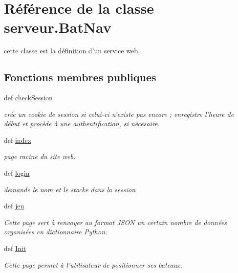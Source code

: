 \hypertarget{classserveur_1_1BatNav}{\section{Référence de la classe serveur.\-Bat\-Nav}
\label{classserveur_1_1BatNav}
}


cette classe est la définition d'un service web.  


\subsection*{Fonctions membres publiques}
\begin{DoxyCompactItemize}
\item 
def \hyperlink{classserveur_1_1BatNav_a4bee30dcf9c6439b0120b0f84e351c8e}{check\-Session}
\begin{DoxyCompactList}\small\item\em crée un cookie de session si celui-\/ci n'existe pas encore ; enregistre l'heure de début et procède à une authentification, si nécesaire. \end{DoxyCompactList}\item 
def \hyperlink{classserveur_1_1BatNav_a788dcf39ae9210eece7d5a1ee4ea593e}{index}
\begin{DoxyCompactList}\small\item\em page racine du site web. \end{DoxyCompactList}\item 
def \hyperlink{classserveur_1_1BatNav_afb6d70a94f46205136428435bffdc442}{login}
\begin{DoxyCompactList}\small\item\em demande le nom et le stocke dans la session \end{DoxyCompactList}\item 
def \hyperlink{classserveur_1_1BatNav_a2e39322808163b8d156562e198518ccf}{jeu}
\begin{DoxyCompactList}\small\item\em Cette page sert à renvoyer au format J\-S\-O\-N un certain nombre de données organisées en dictionnaire Python. \end{DoxyCompactList}\item 
def \hyperlink{classserveur_1_1BatNav_a88cb8ae9a230bca42163914af847774c}{Init}
\begin{DoxyCompactList}\small\item\em Cette page permet à l'utilisateur de positionner ses bateaux. \end{DoxyCompactList}\item 

\end{DoxyCompactItemize}
